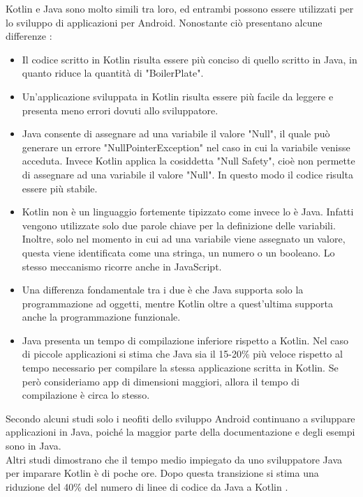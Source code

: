 Kotlin e Java sono molto simili tra loro, ed entrambi possono essere utilizzati per lo sviluppo di applicazioni per Android. Nonostante ci\`o presentano alcune differenze \cite{KotlinBaeldung}:
\begin{itemize}
      \item Il codice scritto in Kotlin risulta essere pi\`u conciso di quello scritto in Java, in quanto riduce la quantit\`a di "BoilerPlate".
      \item Un'applicazione sviluppata in Kotlin risulta essere pi\`u facile da leggere e presenta meno errori dovuti allo sviluppatore.
      \item Java consente di assegnare ad una variabile il valore "Null", il quale pu\`o generare un errore "NullPointerException" nel caso in cui la variabile venisse acceduta. Invece
            Kotlin applica la cosiddetta "Null Safety", cio\`e non permette di assegnare ad una variabile il valore "Null". In questo modo il codice risulta essere pi\`u stabile.
      \item Kotlin non \`e un linguaggio fortemente tipizzato come invece lo \`e Java. Infatti vengono utilizzate solo due parole chiave per la definizione delle variabili. Inoltre, solo nel momento in cui ad una variabile viene assegnato un valore, questa viene
            identificata come una stringa, un numero o un booleano. Lo stesso meccanismo ricorre anche in JavaScript.
      \item Una differenza fondamentale tra i due \`e che Java supporta solo la programmazione ad oggetti, mentre Kotlin oltre a quest'ultima supporta anche la programmazione funzionale.
      \item Java presenta un tempo di compilazione inferiore rispetto a Kotlin. Nel caso di piccole applicazioni si stima che Java sia il 15-20\% pi\`u veloce rispetto
            al tempo necessario per compilare la stessa applicazione scritta in Kotlin. Se per\`o consideriamo app di dimensioni maggiori, allora il tempo di compilazione \`e circa lo stesso.

\end{itemize}

Secondo alcuni studi solo i neofiti dello sviluppo Android continuano a sviluppare applicazioni in Java, poich\'e la maggior parte
della documentazione e degli esempi sono in Java.\\
Altri studi dimostrano che il tempo medio impiegato da uno sviluppatore Java per imparare Kotlin \`e di poche ore. Dopo questa transizione si stima una riduzione del 40\% del numero di linee di codice da Java a Kotlin \cite{KotlinInfoWorld}.\\
